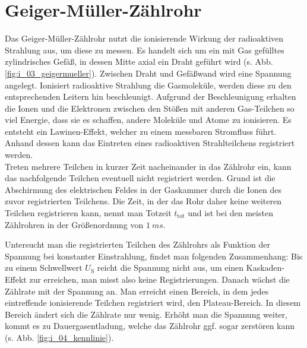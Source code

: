 \section{Geiger-Müller-Zählrohr}
Das Geiger-Müller-Zählrohr nutzt die ionisierende Wirkung der radioaktiven Strahlung aus, um diese zu messen. Es handelt sich um ein mit Gas gefülltes zylindrisches Gefäß, in dessen Mitte axial ein Draht geführt wird (s. Abb. \ref{fig:i_03_geigermueller}). Zwischen Draht und Gefäßwand wird eine Spannung angelegt. Ionisiert radioaktive Strahlung die Gasmoleküle, werden diese zu den entsprechenden Leitern hin beschleunigt. Aufgrund der Beschleunigung erhalten die Ionen und die Elektronen zwischen den Stößen mit anderen Gas-Teilchen so viel Energie, dass sie es schaffen, andere Moleküle und Atome zu ionisieren. Es entsteht ein Lawinen-Effekt, welcher zu einem messbaren Stromfluss führt. Anhand dessen kann das Eintreten eines radioaktiven Strahlteilchens registriert werden.\\
Treten mehrere Teilchen in kurzer Zeit nacheinander in das Zählrohr ein, kann das nachfolgende Teilchen eventuell nicht registriert werden. Grund ist die Abschirmung des elektrischen Feldes in der Gaskammer durch die Ionen des zuvor registrierten Teilchens. Die Zeit, in der das Rohr daher keine weiteren Teilchen registrieren kann, nennt man Totzeit $t_\mathrm{tot}$ und ist bei den meisten Zählrohren in der Größenordnung von $\SI{1}{ms}$.


Untersucht man die registrierten Teilchen des Zählrohrs als Funktion der Spannung bei konstanter Einstrahlung, findet man folgenden Zusammenhang: Bis zu einem Schwellwert $U_\mathrm S$ reicht die Spannung nicht aus, um einen Kaskaden-Effekt zur erreichen, man misst also keine Registrierungen. Danach wächst die Zählrate mit der Spannung an. Man erreicht einen Bereich, in dem jedes eintreffende ionisierende Teilchen registriert wird, den Plateau-Bereich. In diesem Bereich ändert sich die Zählrate nur wenig. Erhöht man die Spannung weiter, kommt es zu Dauergasentladung, welche das Zählrohr ggf. sogar zerstören kann (s. Abb. \ref{fig:i_04_kennlinie}).


